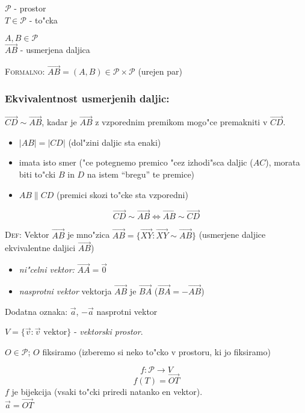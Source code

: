 \(\mathcal{P}\) - prostor\\
\(T \in \mathcal{P}\) - to"cka

\(A, B \in \mathcal{P}\)\\
\(\overrightarrow{AB}\) - usmerjena daljica

\textsc{Formalno:} \(\overrightarrow{AB} = (A, B) \in \mathcal{P} \times \mathcal{P}\) (urejen par)

\subsubsection*{Ekvivalentnost usmerjenih daljic:}

\(\overrightarrow{CD} \sim \overrightarrow{AB}\), kadar je \(\overrightarrow{AB}\) z vzporednim premikom mogo"ce premakniti v \(\overrightarrow{CD}\).
\begin{itemize}
	\item \(|AB| = |CD|\) (dol"zini daljic sta enaki)
	\item imata isto smer ("ce potegnemo premico "cez izhodi"sca daljic (\(AC\)), morata biti to"cki \(B\) in \(D\) na istem ``bregu'' te premice)
	\item \(AB \parallel CD\) (premici skozi to"cke sta vzporedni)
\end{itemize}
\[\overrightarrow{CD} \sim \overrightarrow{AB} \iff \overrightarrow{AB} \sim \overrightarrow{CD}\]

\textsc{Def:} Vektor \(\vec{AB}\) je mno"zica \(\vec{AB} = \{\overrightarrow{XY}: \overrightarrow{XY} \sim \overrightarrow{AB}\}\) (usmerjene daljice ekvivalentne daljici \(\overrightarrow{AB}\))

\begin{itemize}
	\item \emph{ni"celni vektor:} \(\vec{AA} = \vec{0}\)
	\item \emph{nasprotni vektor} vektorja \(\vec{AB}\) je \(\vec{BA}\) (\(\vec{BA} = -\vec{AB}\))
\end{itemize}

Dodatna oznaka: \(\vec{a}\), \(-\vec{a}\) nasprotni vektor

\(V = \{\vec{v}: \vec{v} \text{ vektor} \}\) - \emph{vektorski prostor}.

\(O \in \mathcal{P}\); \(O\) fiksiramo (izberemo si neko to"cko v prostoru, ki jo fiksiramo)

\[f: \mathcal{P} \rightarrow V\]
\[f(T) = \vec{OT}\]
\(f\) je bijekcija (vsaki to"cki priredi natanko en vektor).\\
\(\vec{a} = \vec{OT}\)

